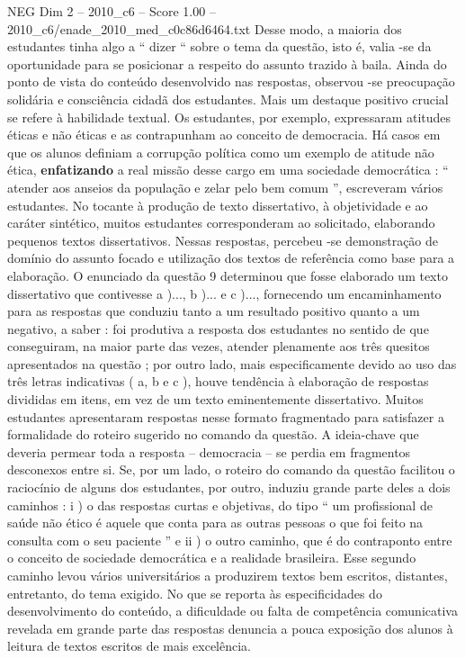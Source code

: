 \begin{textsample}{NEG Dim 2 – 2010\_c6 – Score 1.00 – 2010\_c6/enade\_2010\_med\_c0c86d6464.txt}
Desse modo, a maioria dos estudantes tinha algo a “ dizer “ sobre o tema da questão, isto é, valia -se da oportunidade para se posicionar a respeito do assunto trazido à baila.
Ainda do ponto de vista do conteúdo desenvolvido nas respostas, observou -se preocupação solidária e consciência cidadã dos estudantes.
Mais um destaque positivo crucial se refere à habilidade textual.
Os estudantes, por exemplo, expressaram atitudes éticas e não éticas e as contrapunham ao conceito de democracia.
Há casos em que os alunos definiam a corrupção política como um exemplo de atitude não ética, \textbf{enfatizando} a real missão desse cargo em uma sociedade democrática : “ atender aos anseios da população e zelar pelo bem comum ”, escreveram vários estudantes.
No tocante à produção de texto dissertativo, à objetividade e ao caráter sintético, muitos estudantes corresponderam ao solicitado, elaborando pequenos textos dissertativos.
Nessas respostas, percebeu -se demonstração de domínio do assunto focado e utilização dos textos de referência como base para a elaboração.
O enunciado da questão 9 determinou que fosse elaborado um texto dissertativo que contivesse a )..., b )... e c )..., fornecendo um encaminhamento para as respostas que conduziu tanto a um resultado positivo quanto a um negativo, a saber : foi produtiva a resposta dos estudantes no sentido de que conseguiram, na maior parte das vezes, atender plenamente aos três quesitos apresentados na questão ; por outro lado, mais especificamente devido ao uso das três letras indicativas ( a, b e c ), houve tendência à elaboração de respostas divididas em itens, em vez de um texto eminentemente dissertativo.
Muitos estudantes apresentaram respostas nesse formato fragmentado para satisfazer a formalidade do roteiro sugerido no comando da questão.
A ideia-chave que deveria permear toda a resposta – democracia – se perdia em fragmentos desconexos entre si.
Se, por um lado, o roteiro do comando da questão facilitou o raciocínio de alguns dos estudantes, por outro, induziu grande parte deles a dois caminhos : i ) o das respostas curtas e objetivas, do tipo “ um profissional de saúde não ético é aquele que conta para as outras pessoas o que foi feito na consulta com o seu paciente ” e ii ) o outro caminho, que é do contraponto entre o conceito de sociedade democrática e a realidade brasileira.
Esse segundo caminho levou vários universitários a produzirem textos bem escritos, distantes, entretanto, do tema exigido.
No que se reporta às especificidades do desenvolvimento do conteúdo, a dificuldade ou falta de competência comunicativa revelada em grande parte das respostas denuncia a pouca exposição dos alunos à leitura de textos escritos de mais excelência.

\end{textsample}
